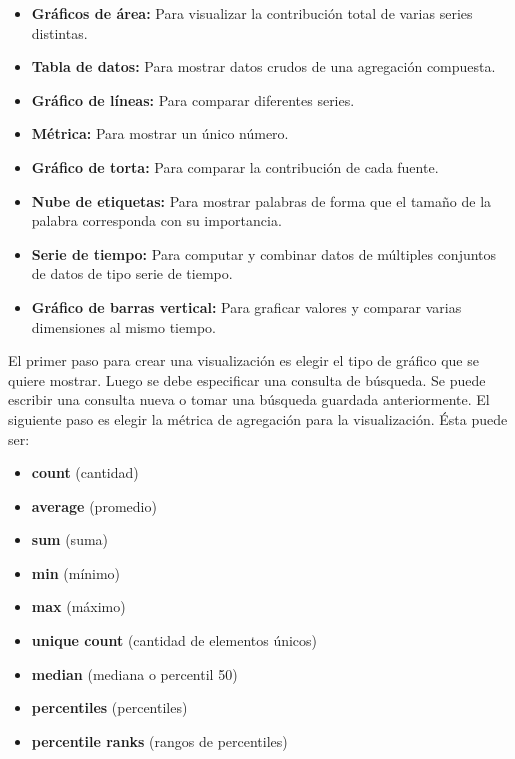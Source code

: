 \begin{itemize}

  \item \textbf{Gráficos de área:}
  Para visualizar la contribución total de varias series distintas.

  \item \textbf{Tabla de datos:}
  Para mostrar datos crudos de una agregación compuesta.

  \item \textbf{Gráfico de líneas:}
  Para comparar diferentes series.

  \item \textbf{Métrica:}
  Para mostrar un único número.

  \item \textbf{Gráfico de torta:}
  Para comparar la contribución de cada fuente.

  \item \textbf{Nube de etiquetas:}
  Para mostrar palabras de forma que el tamaño de la palabra corresponda con su importancia.

  \item \textbf{Serie de tiempo:}
  Para computar y combinar datos de múltiples conjuntos de datos de tipo serie de tiempo.

  \item \textbf{Gráfico de barras vertical:}
  Para graficar valores y comparar varias dimensiones al mismo tiempo.

\end{itemize}


El primer paso para crear una visualización es elegir el tipo de gráfico que se
quiere mostrar. Luego se debe especificar una consulta de búsqueda. Se puede
escribir una consulta nueva o tomar una búsqueda guardada anteriormente. El
siguiente paso es elegir la métrica de agregación para la visualización. Ésta
puede ser:

\begin{itemize}
  \item \textbf{count} (cantidad)
  \item \textbf{average} (promedio)
  \item \textbf{sum} (suma)
  \item \textbf{min} (mínimo)
  \item \textbf{max} (máximo)
  \item \textbf{unique count} (cantidad de elementos únicos)
  \item \textbf{median} (mediana o percentil 50)
  \item \textbf{percentiles} (percentiles)
  \item \textbf{percentile ranks} (rangos de percentiles)
\end{itemize}



